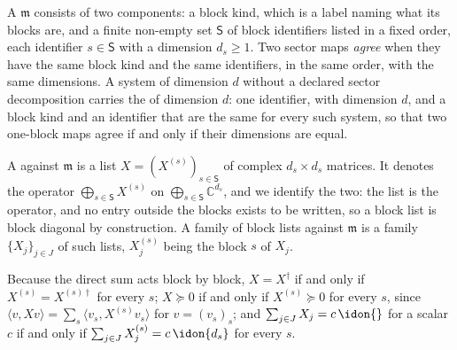 
\begin{definition}\label{def:sector-map}
A  $\mathfrak{m}$ consists of two
components: a block kind,
which is a label naming what its blocks are, and a finite non-empty set
$\mathsf{S}$ of block identifiers listed in a fixed order, each identifier
$s\in\mathsf{S}$ with a dimension $d_s\ge1$. Two sector maps \emph{agree} when
they have the same block kind and the same identifiers, in the same order, with
the same dimensions. A system of dimension $d$ without a declared sector
decomposition carries the  of dimension
$d$: one
identifier, with dimension $d$, and a block kind and an identifier that are
the same for every such system, so that two one-block maps agree if and only
if their dimensions are equal.

A  against
$\mathfrak{m}$ is a list
$X=(X^{(s)})_{s\in\mathsf{S}}$ of complex $d_s\times d_s$ matrices. It denotes
the operator $\bigoplus_{s\in\mathsf{S}}X^{(s)}$ on
$\bigoplus_{s\in\mathsf{S}}\mathbb{C}^{d_s}$, and we identify the two: the list
is the operator, and no entry outside the blocks exists to be written, so a
block list is block diagonal by construction. A family of block lists against
$\mathfrak{m}$ is a family
$\{X_j\}_{j\in J}$ of such lists, $X^{(s)}_j$ being the block $s$ of $X_j$.

Because the direct sum acts block by block, $X=X^{\dagger}$ if and only if
$X^{(s)}=X^{(s)\dagger}$ for every $s$; $X\succeq0$ if and only if
$X^{(s)}\succeq0$ for every $s$, since
$\langle v,Xv\rangle=\sum_s\langle v_s,X^{(s)}v_s\rangle$ for $v=(v_s)_s$; and
$\sum_{j\in J}X_j=c\,\idon{}$ for a scalar $c$ if and only if
$\sum_{j\in J}X^{(s)}_j=c\,\idon{d_s}$ for every $s$.
\end{definition}

